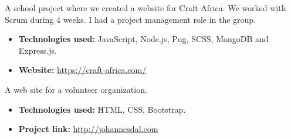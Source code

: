 
A school project where we created a website for Craft Africa. We worked with Scrum during 4 weeks. I had a project management role in the group.

\vspace{6pt}

\begin{itemize}
    \item \textbf{Technologies used:} JavaScript, Node.js, Pug, SCSS, MongoDB and Express.js.
    \item \textbf{Website:} \href{https://craft-africa.com/}{https://craft-africa.com/}
\end{itemize}

\divider

A web site for a volunteer organization.

\vspace{6pt}

\begin{itemize}
    \item \textbf{Technologies used:} HTML, CSS, Bootstrap.
    \item \textbf{Project link:} \href{http://johannesdal.com}{http://johannesdal.com}
\end{itemize}
